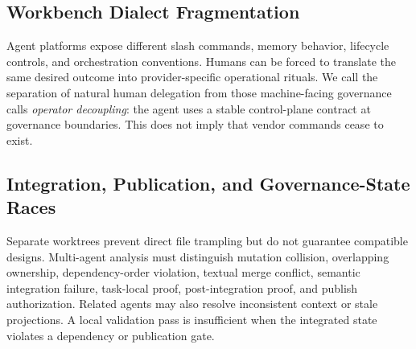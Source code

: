 \subsection{Workbench Dialect Fragmentation}
Agent platforms expose different slash commands, memory behavior, lifecycle controls, and orchestration conventions. Humans can be forced to translate the same desired outcome into provider-specific operational rituals. We call the separation of natural human delegation from those machine-facing governance calls \emph{operator decoupling}: the agent uses a stable control-plane contract at governance boundaries. This does not imply that vendor commands cease to exist.

\subsection{Integration, Publication, and Governance-State Races}
Separate worktrees prevent direct file trampling but do not guarantee compatible designs. Multi-agent analysis must distinguish mutation collision, overlapping ownership, dependency-order violation, textual merge conflict, semantic integration failure, task-local proof, post-integration proof, and publish authorization. Related agents may also resolve inconsistent context or stale projections. A local validation pass is insufficient when the integrated state violates a dependency or publication gate.
